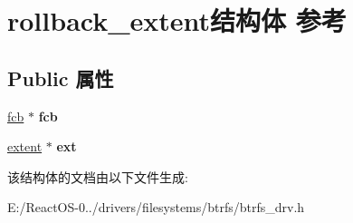 \hypertarget{structrollback__extent}{}\section{rollback\+\_\+extent结构体 参考}
\label{structrollback__extent}
\subsection*{Public 属性}
\begin{DoxyCompactItemize}
\item 
\mbox{\label{structrollback__extent_aae31dc384a7c7cb84a88d7408e111849}} 
\hyperlink{struct__fcb}{fcb} $\ast$ {\bfseries fcb}
\item 
\mbox{\label{structrollback__extent_aeab2eb7c70602463cc5f2465645df678}} 
\hyperlink{structextent}{extent} $\ast$ {\bfseries ext}
\end{DoxyCompactItemize}


该结构体的文档由以下文件生成\+:\begin{DoxyCompactItemize}
\item 
E\+:/\+React\+O\+S-\/0../drivers/filesystems/btrfs/btrfs\+\_\+drv.\+h\end{DoxyCompactItemize}
